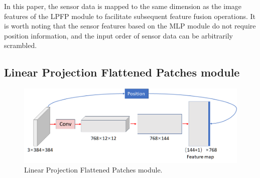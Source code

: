 \documentclass[acmsmall,manuscript, screen, review]{acmart}
\begin{document}
In this paper, the sensor data is mapped to the same dimension as the image features of the LPFP module to facilitate subsequent feature fusion operations. It is worth noting that the sensor features based on the MLP module do not require position information, and the input order of sensor data can be arbitrarily scrambled.

\subsection{Linear Projection Flattened Patches module}
\begin{figure}[htbp]
  \centering
  \includegraphics[width=0.7\linewidth]{pic/linear_projection_flattened_patches_module.png}
  \caption{Linear Projection Flattened Patches module.}
  \label{linear_projection}
\end{figure}
\end{document}
